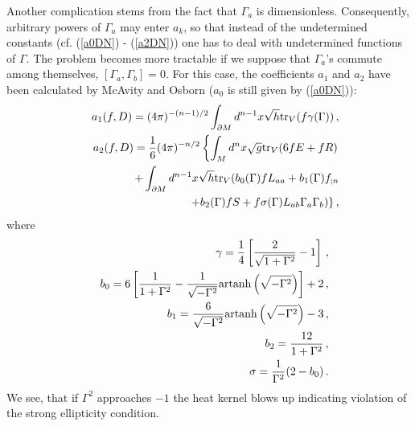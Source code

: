 Another complication stems from the fact that $\Gamma_a$ is dimensionless.
Consequently, arbitrary powers of $\Gamma_a$ may enter $a_k$, so that instead
of the undetermined constants (cf. (\ref{a0DN}) - (\ref{a2DN}))
one has to deal with undetermined functions of $\Gamma$. The problem
becomes more tractable if we suppose that $\Gamma_a$'s commute among
themselves, $[\Gamma_a,\Gamma_b]=0$. For this case, the coefficients
$a_1$ and $a_2$ have been calculated by McAvity and Osborn 
\cite{McAvity:1991xf} ($a_0$ is still given by (\ref{a0DN})):
\begin{eqnarray}
&&a_1(f,D)=(4\pi )^{-(n-1)/2} \int_{\partial M} d^{n-1}x\sqrt{h} {\rm tr}_V (f\gamma (\Gamma ))\,,
\label{a1ob}\\
&&a_2(f,D)=\frac 16 (4\pi)^{-n/2}\left\{ \int_M d^nx\sqrt{g}
     {\rm tr}_V(6fE+fR) \right. \nonumber \\
&&\qquad\qquad +\int_{\partial M} d^{n-1}x\sqrt{h} {\rm tr}_V(b_0(\Gamma) fL_{ aa}
     +b_1(\Gamma) f_{ ;n}\nonumber\\
&&\qquad\qquad \left. +b_2(\Gamma) fS+f\sigma (\Gamma) L_{ab}
     \Gamma_a\Gamma_b )
     \right\} ,\label{a2ob}
\end{eqnarray}   
where
\begin{eqnarray}
&&\gamma =\frac 14 \left[ \frac 2{\sqrt{1+\Gamma^2}} -1\right]\,,
\nonumber\\
&&b_0=6\left[ \frac 1{1+\Gamma^2}-\frac 1{\sqrt{-\Gamma^2}}
{\rm artanh} \left( \sqrt{-\Gamma^2} \right) \right]+2\,,\nonumber\\
&&b_1=\frac 6{\sqrt{-\Gamma^2}} {\rm artanh} \left( \sqrt{-\Gamma^2} \right)
-3 \,,\label{obliqueconst}\\
&&b_2=\frac {12}{1+\Gamma^2} \,,\nonumber\\
&&\sigma = \frac 1{\Gamma^2} (2-b_0) \,.\nonumber
\end{eqnarray}
We see, that if $\Gamma^2$ approaches $-1$ the heat kernel blows up
indicating violation of the strong ellipticity condition.

